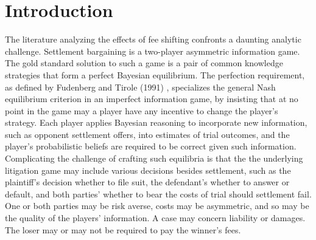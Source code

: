 \documentclass{article}
\begin{document}
\section{Introduction}
The literature analyzing the effects of fee shifting confronts a daunting analytic challenge. Settlement bargaining is a two-player asymmetric information game. The gold standard solution to such a game is a pair of common knowledge strategies that form a perfect Bayesian equilibrium. The perfection requirement, as defined by Fudenberg and Tirole (1991) \cite{fudenberg}, specializes the general Nash \cite{nash} equilibrium criterion in an imperfect information game, by insisting that at no point in the game may a player have any incentive to change the player's strategy. Each player applies Bayesian reasoning to incorporate new information, such as opponent settlement offers, into estimates of trial outcomes, and the player's probabilistic beliefs are required to be correct given such information. Complicating the challenge of crafting such equilibria is that the the underlying litigation game may include various decisions besides settlement, such as the plaintiff's decision whether to file suit, the defendant's whether to answer or default, and both parties' whether to bear the costs of trial should settlement fail. One or both parties may be risk averse, costs may be asymmetric, and so may be the quality of the players' information. A case may concern liability or damages. The loser may or may not be required to pay the winner's fees.
\end{document}
